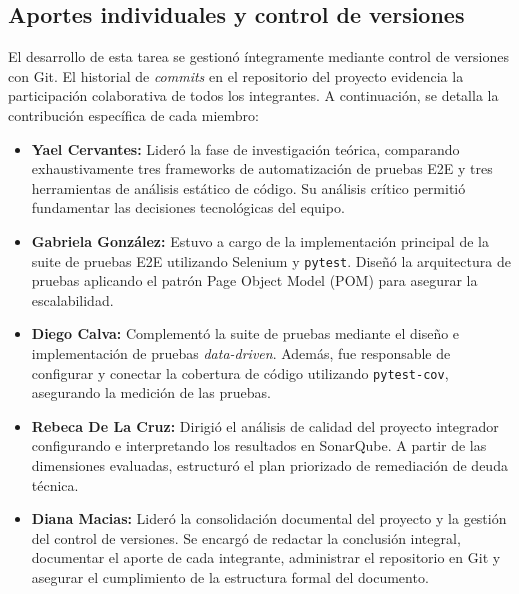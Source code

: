 \documentclass{article}
\begin{document}
\subsection{Aportes individuales y control de versiones}
El desarrollo de esta tarea se gestionó íntegramente mediante control de versiones con Git. El historial de \textit{commits} en el repositorio del proyecto evidencia la participación colaborativa de todos los integrantes. A continuación, se detalla la contribución específica de cada miembro:

\begin{itemize}
    \item \textbf{Yael Cervantes:} Lideró la fase de investigación teórica, comparando exhaustivamente tres frameworks de automatización de pruebas E2E y tres herramientas de análisis estático de código. Su análisis crítico permitió fundamentar las decisiones tecnológicas del equipo.
    
    \item \textbf{Gabriela González:} Estuvo a cargo de la implementación principal de la suite de pruebas E2E utilizando Selenium y \texttt{pytest}. Diseñó la arquitectura de pruebas aplicando el patrón Page Object Model (POM) para asegurar la escalabilidad.
    
    \item \textbf{Diego Calva:} Complementó la suite de pruebas mediante el diseño e implementación de pruebas \textit{data-driven}. Además, fue responsable de configurar y conectar la cobertura de código utilizando \texttt{pytest-cov}, asegurando la medición de las pruebas.
    
    \item \textbf{Rebeca De La Cruz:} Dirigió el análisis de calidad del proyecto integrador configurando e interpretando los resultados en SonarQube. A partir de las dimensiones evaluadas, estructuró el plan priorizado de remediación de deuda técnica.
    
    \item \textbf{Diana Macias:} Lideró la consolidación documental del proyecto y la gestión del control de versiones. Se encargó de redactar la conclusión integral, documentar el aporte de cada integrante, administrar el repositorio en Git y asegurar el cumplimiento de la estructura formal del documento.
\end{itemize}

\end{document}

